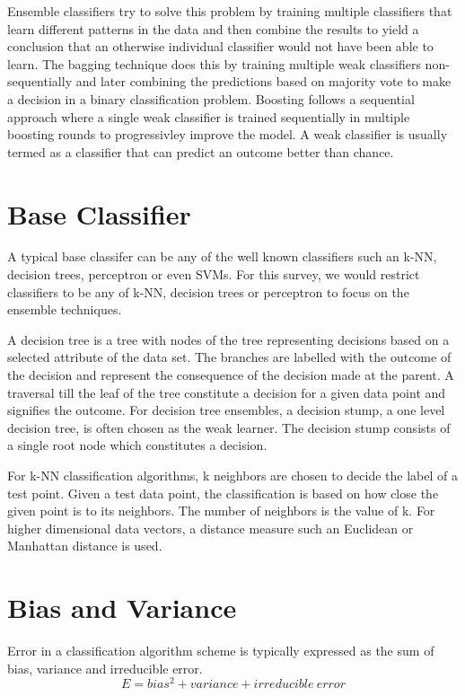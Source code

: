 \documentclass{acmtog} %
\begin{document}
Ensemble classifiers try to solve this problem by training multiple classifiers that learn different patterns in the data and then combine the results to yield a conclusion that an otherwise individual classifier would not have been able to learn. The bagging technique does this by training multiple weak classifiers non-sequentially and later combining the predictions based on majority vote to make a decision in a binary classification problem. Boosting follows a sequential approach where a single weak classifier is trained sequentially in multiple boosting rounds to progressivley improve the model. A weak classifier is usually termed as a classifier that can predict an outcome better than chance. 

\section{Base Classifier}
A typical base classifer can be any of the well known classifiers such an k-NN, decision trees, perceptron or even SVMs. For this survey, we would restrict classifiers to be any of k-NN, decision trees or perceptron to focus on the ensemble techniques. 

A decision tree is a tree with nodes of the tree representing decisions based on a selected attribute of the data set. The branches are labelled with the outcome of the decision and represent the consequence of the decision made at the parent. A traversal till the leaf of the tree constitute a decision for a given data point and signifies the outcome. For decision tree ensembles, a decision stump, a one level decision tree, is often chosen as the weak learner. The decision stump consists of a single root node which constitutes a decision. 

For k-NN classification algorithms, k neighbors are chosen to decide the label of a test point. Given a test data point, the classification is based on how close the given point is to its neighbors. The number of neighbors is the value of k. For higher dimensional data vectors, a distance measure such an Euclidean or Manhattan distance is used. 

\section{Bias and Variance}
Error in a classification algorithm scheme is typically expressed as the sum of bias, variance and irreducible error.
\begin{equation}
	E = bias^2 + variance + irreducible\ error
\label{eq:errorEq}
\end{equation}
\end{document}
